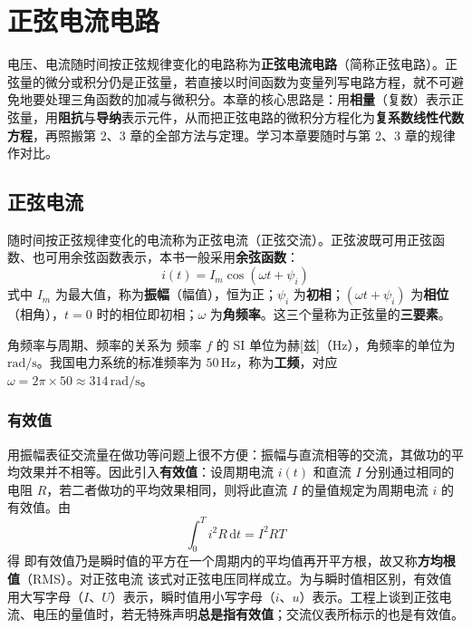 \chapter{正弦电流电路}

\noindent
电压、电流随时间按正弦规律变化的电路称为\textbf{正弦电流电路}（简称正弦电路）。正弦量的微分或积分仍是正弦量，若直接以时间函数为变量列写电路方程，就不可避免地要处理三角函数的加减与微积分。本章的核心思路是：用\textbf{相量}（复数）表示正弦量，用\textbf{阻抗}与\textbf{导纳}表示元件，从而把正弦电路的微积分方程化为\textbf{复系数线性代数方程}，再照搬第 2、3 章的全部方法与定理。学习本章要随时与第 2、3 章的规律作对比。

\section{正弦电流}
随时间按正弦规律变化的电流称为正弦电流（正弦交流）。正弦波既可用正弦函数、也可用余弦函数表示，本书一般采用\textbf{余弦函数}：
\begin{equation}
i(t)=I_m\cos\left(\omega t+\psi_i\right)
\end{equation}
式中 $I_m$ 为最大值，称为\textbf{振幅}（幅值），恒为正；$\psi_i$ 为\textbf{初相}；$\left(\omega t+\psi_i\right)$ 为\textbf{相位}（相角），$t=0$ 时的相位即初相；$\omega$ 为\textbf{角频率}。这三个量称为正弦量的\textbf{三要素}。

角频率与周期、频率的关系为
频率 $f$ 的 SI 单位为赫[兹]（$\mathrm{Hz}$），角频率的单位为 $\mathrm{rad/s}$。我国电力系统的标准频率为 $50\,\mathrm{Hz}$，称为\textbf{工频}，对应 $\omega=2\pi\times50\approx314\,\mathrm{rad/s}$。

\subsection{有效值}
用振幅表征交流量在做功等问题上很不方便：振幅与直流相等的交流，其做功的平均效果并不相等。因此引入\textbf{有效值}：设周期电流 $i(t)$ 和直流 $I$ 分别通过相同的电阻 $R$，若二者做功的平均效果相同，则将此直流 $I$ 的量值规定为周期电流 $i$ 的有效值。由
\begin{equation}
\int_0^{T}i^2R\,\mathrm{d}t=I^2RT
\end{equation}
得
即有效值乃是瞬时值的平方在一个周期内的平均值再开平方根，故又称\textbf{方均根值}（RMS）。对正弦电流
该式对正弦电压同样成立。为与瞬时值相区别，有效值用大写字母（$I$、$U$）表示，瞬时值用小写字母（$i$、$u$）表示。工程上谈到正弦电流、电压的量值时，若无特殊声明\textbf{总是指有效值}；交流仪表所标示的也是有效值。

